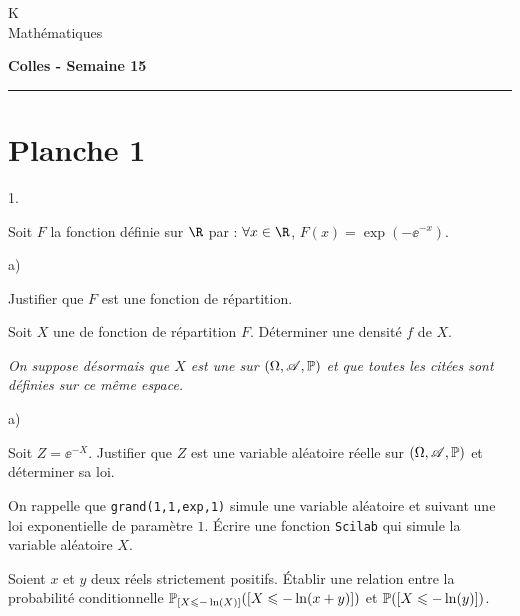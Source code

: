 \documentclass[11pt]{article}%
\begin{document}
\begin{flushleft}
K \\
Mathématiques
\end{flushleft}

\begin{center}
\textbf{\Large{Colles - Semaine 15}}
\end{center}

\hrule

\vspace*{0,2cm}

\section*{Planche 1} %

\noindent
\begin{noliste}{1.}
 \item Soit $F$ la fonction définie sur $\R$ par : $\forall x\in\R$, 
 $F(x)=\exp\left(-\ee^{-x}\right)$.
 \begin{noliste}{a)}
  \item Justifier que $F$ est une fonction de répartition.
  \item Soit $X$ une \var de fonction de répartition $F$. Déterminer 
  une densité $f$ de $X$.
 \end{noliste}
 {\it On suppose désormais que $X$ est une \var sur $(\Omega, \mathscr{A}, 
 \mathbb{P})$ et que toutes les \var citées sont définies sur ce même 
 espace.}
 
 \item 
 \begin{noliste}{a)}
  \item Soit $Z=\ee^{-X}$. Justifier que $Z$ est une variable aléatoire 
  réelle sur $(\Omega, \mathscr{A}, \mathbb{P})$ et déterminer sa loi.
  \item On rappelle que {\tt grand(1,1,\ttq{}exp\ttq{},1)} simule
    une variable aléatoire et suivant une loi
    exponentielle de paramètre $1$. Écrire une
    fonction {\tt Scilab} qui simule la variable
    aléatoire $X$.
  \item Soient $x$ et $y$ deux réels strictement positifs. Établir une 
  relation entre la probabilité conditionnelle 
  $\mathbb{P}_{\left[ {X\leqslant -\ln(X)} \right]}(\left[ {X\leqslant -\ln(x+y)} \right])$ et 
  $\mathbb{P}(\left[ {X\leqslant - \ln(y)} \right])$.
 \end{noliste}
 

\end{noliste}
\end{document}
